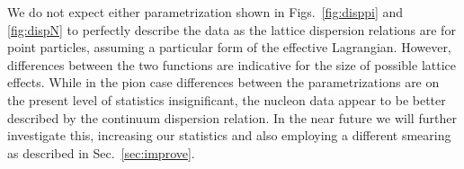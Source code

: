 We do not expect either parametrization shown in Figs.~\ref{fig:disppi} and
\ref{fig:dispN} to
perfectly describe the data as the lattice dispersion relations
are for point particles, assuming a particular form of the
effective Lagrangian. However, differences between the two functions
are indicative for the size of possible lattice effects.
While in the pion case differences between the parametrizations
are on the present level of statistics insignificant, the nucleon data
appear to be better described by the continuum dispersion relation.
In the near future we will further investigate this, increasing
our statistics and also employing a different smearing as described in
Sec.~\ref{sec:improve}.


